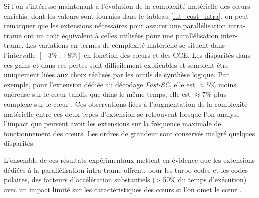 \documentclass[../main.tex]{subfiles}
\begin{document}
Si l'on s'intéresse maintenant à l'évolution de la complexité matérielle des cœurs enrichis, dont les valeurs sont fournies dans le tableau \ref{lut_cost_intra}, on peut remarquer que les extensions nécessaires pour assurer une parallélisation intra-trame ont un coût équivalent à celles utilisées pour une parallélisation inter-trame. 
Les variations en termes de complexité matérielle se situent dans l'intervalle $[-3\%\ ; +8\%]$ en fonction des cœurs et des CCE. 
Les disparités dans ces gains et dans ces pertes sont difficilement explicables et semblent être uniquement liées aux choix réalisés par les outils de synthèse logique. 
Par exemple, pour l'extension dédiée au décodage \textit{Fast-SC}, elle est $\approx 5\%$ moins onéreuse sur le cœur \PicoRV\space tandis que dans le même temps, elle est $\approx 7\%$ plus complexe sur le cœur \IBEX.
Ces observations liées à l'augmentation de la complexité matérielle entre ces deux types d'extension se retrouvent lorsque l'on analyse l'impact que peuvent avoir les extensions sur la fréquence maximale de fonctionnement des cœurs. 
Les ordres de grandeur sont conservés malgré quelques disparités.

L'ensemble de ces résultats expérimentaux mettent en évidence que les extensions dédiées à la parallélisation intra-trame offrent, pour les turbo codes et les codes polaires, des facteurs d'accélération substantiels (> 50\% du temps d'exécution) avec un impact limité sur les caractéristiques des cœurs si l'on omet le cœur \PicoRV.




%
%
%
%
\end{document}
